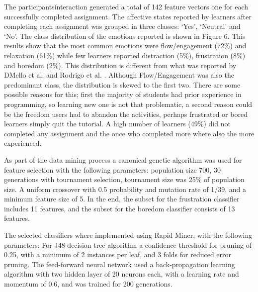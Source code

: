 \documentclass[a4paper,twoside]{article}
\begin{document}
The participants\' interaction generated a total of 142 feature vectors one for each
successfully completed assignment. The affective states reported by learners after
completing each assignment was grouped in three classes: ‘Yes’, ‘Neutral’ and
‘No’. The class distribution of the emotions reported is shown in Figure 6. This
results show that the most common emotions were flow/engagement (72\%) and
relaxation (61\%) while few learners reported distraction (5\%), frustration
(8\%) and boredom (2\%). This distribution is different from what was reported
by D\'Mello et al. \cite{bixler2013detecting} and Rodrigo et al. \cite{rodrigo2009affective}.
Although Flow/Engagement was
also the predominant class, the distribution is skewed to the first two. There
are some possible reasons for this; first the majority of students had
prior experience in programming, so learning new one is not that problematic, a second
reason could be the freedom users had to abandon the activities, perhaps
frustrated or bored learners simply quit the tutorial. A high number of learners
(49\%) did not completed any assignment and the once who completed more where also
the more experienced.

As part of the data mining process a canonical genetic algorithm was used for feature
selection with the following parameters: population size 700, 30 generations with
tournament selection, tournament size was 25\% of population size. A uniform crossover
with 0.5 probability and mutation rate of 1/39, and a minimum feature size of 5.
In the end, the subset for the frustration classifier includes 11 features, and the subset for the boredom classifier consists of
13 features.

The selected classifiers where implemented using Rapid Miner, with the
following parameters: For J48 decision tree algorithm a confidence threshold
for pruning of 0.25, with a minimum of 2 instances per leaf, and 3 folds for
reduced error pruning. The feed-forward neural network used a back-propagation
learning algorithm with two hidden layer of 20 neurons each, with a learning
rate and momentum of 0.6, and was trained for 200 generations.
\end{document}
